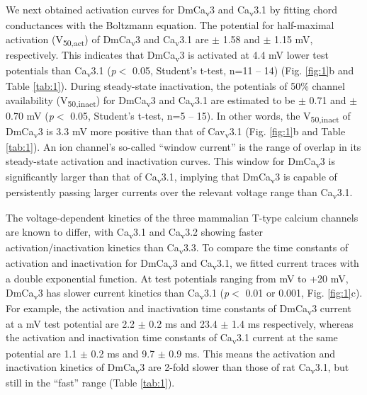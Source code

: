 We next obtained activation curves for DmCa\textsubscript{v}3 and Ca\textsubscript{v}3.1 by fitting chord conductances with the Boltzmann equation. The potential for half-maximal activation (V\textsubscript{50,act}) of DmCa\textsubscript{v}3 and Ca\textsubscript{v}3.1 are  $\pm$ 1.58 and  $\pm$ 1.15 mV, respectively. This indicates that DmCa\textsubscript{v}3 is activated at 4.4 mV lower test potentials than Ca\textsubscript{v}3.1 (\emph{p}$<$ 0.05, Student's t-test, n=11 -- 14) (Fig. \ref{fig:1}b and Table \ref{tab:1}).
During steady-state inactivation, the potentials of 50\% channel availability (V\textsubscript{50,inact}) for DmCa\textsubscript{v}3 and Ca\textsubscript{v}3.1 are estimated to be  $\pm$ 0.71 and  $\pm$ 0.70 mV (\emph{p}$<$ 0.05, Student's t-test, n=5 -- 15). In other words, the V\textsubscript{50,inact} of DmCa\textsubscript{v}3 is 3.3 mV more positive than that of Cav\textsubscript{v}3.1 (Fig. \ref{fig:1}b and Table \ref{tab:1}).
An ion channel's so-called ``window current'' is the range of overlap in its steady-state activation and inactivation curves. This window for DmCa\textsubscript{v}3 is significantly larger than that of Ca\textsubscript{v}3.1, implying that DmCa\textsubscript{v}3 is capable of persistently passing larger currents over the relevant voltage range than Ca\textsubscript{v}3.1.

The voltage-dependent kinetics of the three mammalian T-type calcium channels are known to differ, with Ca\textsubscript{v}3.1 and Ca\textsubscript{v}3.2 showing faster activation/inactivation kinetics than Ca\textsubscript{v}3.3\cite{klockner:1999aa}.
To compare the time constants of activation and inactivation for DmCa\textsubscript{v}3 and Ca\textsubscript{v}3.1, we fitted current traces with a double exponential function.
At test potentials ranging from  mV to +20 mV,  DmCa\textsubscript{v}3 has slower current kinetics than Ca\textsubscript{v}3.1 (\emph{p}$<$ 0.01 or 0.001, Fig. \ref{fig:1}c).
For example, the activation and inactivation time constants of DmCa\textsubscript{v}3 current at a  mV test potential are 2.2 $\pm$ 0.2 ms and 23.4 $\pm$ 1.4 ms respectively, whereas the activation and inactivation time constants of Ca\textsubscript{v}3.1 current at the same potential are 1.1 $\pm$ 0.2 ms and 9.7 $\pm$ 0.9 ms. This means the activation and inactivation kinetics of DmCa\textsubscript{v}3 are 2-fold slower than those of rat Ca\textsubscript{v}3.1, but still in the ``fast'' range (Table \ref{tab:1}).

